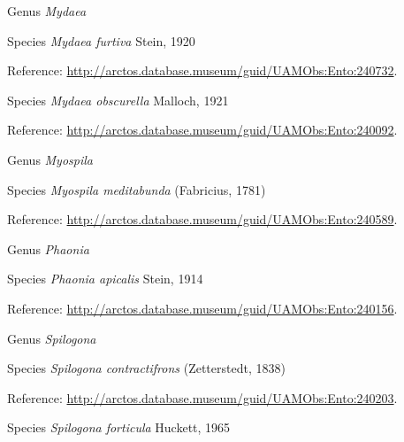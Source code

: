 \documentclass[9pt, article]{memoir}
\begin{document}
\begin{multicols}{2}
\vspace{6pt}\noindent\hspace{30pt}Genus \textit{Mydaea}


\vspace{6pt}\noindent\hspace{36pt}Species \textit{Mydaea furtiva} Stein, 1920


\vspace{6pt}Reference: 
\url{http://arctos.database.museum/guid/UAMObs:Ento:240732}.

\vspace{6pt}\noindent\hspace{36pt}Species \textit{Mydaea obscurella} Malloch, 1921


\vspace{6pt}Reference: 
\url{http://arctos.database.museum/guid/UAMObs:Ento:240092}.

\vspace{6pt}\noindent\hspace{30pt}Genus \textit{Myospila}


\vspace{6pt}\noindent\hspace{36pt}Species \textit{Myospila meditabunda} (Fabricius, 1781)


\vspace{6pt}Reference: 
\url{http://arctos.database.museum/guid/UAMObs:Ento:240589}.

\vspace{6pt}\noindent\hspace{30pt}Genus \textit{Phaonia}


\vspace{6pt}\noindent\hspace{36pt}Species \textit{Phaonia apicalis} Stein, 1914


\vspace{6pt}Reference: 
\url{http://arctos.database.museum/guid/UAMObs:Ento:240156}.

\vspace{6pt}\noindent\hspace{30pt}Genus \textit{Spilogona}


\vspace{6pt}\noindent\hspace{36pt}Species \textit{Spilogona contractifrons} (Zetterstedt, 1838)


\vspace{6pt}Reference: 
\url{http://arctos.database.museum/guid/UAMObs:Ento:240203}.

\vspace{6pt}\noindent\hspace{36pt}Species \textit{Spilogona forticula} Huckett, 1965



\end{multicols}
\end{document}
